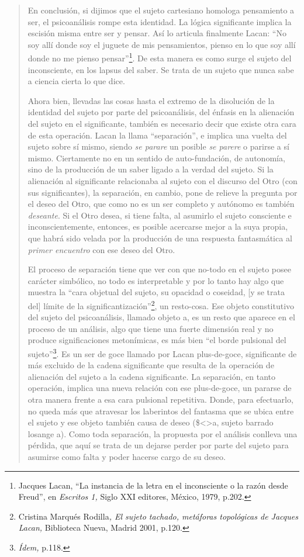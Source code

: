 \begin{quote}
En conclusión, si dijimos que el sujeto cartesiano homologa pensamiento a ser, el psicoanálisis rompe esta identidad. La lógica significante implica la escisión misma entre ser y pensar. Así lo articula finalmente Lacan: \enquote{No soy allí donde soy el juguete de mis pensamientos, pienso en lo que soy allí donde no me pienso pensar}\footnote{Jacques Lacan, \enquote{La instancia de la letra en el inconsciente o la razón desde Freud}, en \emph{Escritos 1,} Siglo XXI editores, México, 1979, p.202.}. De esta manera es como surge el sujeto del inconsciente, en los lapsus del saber. Se trata de un sujeto que nunca sabe a ciencia cierta lo que dice.

Ahora bien, llevadas las cosas hasta el extremo de la disolución de la identidad del sujeto por parte del psicoanálisis, del énfasis en la alienación del sujeto en el significante, también es necesario decir que existe otra cara de esta operación. Lacan la llama \enquote{separación}, e implica una vuelta del sujeto sobre sí mismo, siendo \emph{se parare} un posible \emph{se parere} o parirse a sí mismo. Ciertamente no en un sentido de auto-fundación, de autonomía, sino de la producción de un saber ligado a la verdad del sujeto. Si la alienación al significante relacionaba al sujeto con el discurso del Otro (con sus significantes), la separación, en cambio, pone de relieve la pregunta por el deseo del Otro, que como no es un ser completo y autónomo es también \emph{deseante}. Si el Otro desea, si tiene falta, al asumirlo el sujeto consciente e inconscientemente, entonces, es posible acercarse mejor a la suya propia, que habrá sido velada por la producción de una respuesta fantasmática al \emph{primer encuentro} con ese deseo del Otro.

El proceso de separación tiene que ver con que no-todo en el sujeto posee carácter simbólico, no todo es interpretable y por lo tanto hay algo que muestra la \enquote{cara objetual del sujeto, su opacidad o coseidad, {[}y se trata del{]} límite de la significantización}\footnote{Cristina Marqués Rodilla\emph{, El sujeto tachado, metáforas topológicas de Jacques Lacan,} Biblioteca Nueva, Madrid 2001, p.120.}, un resto-cosa. Ese objeto constitutivo del sujeto del psicoanálisis, llamado objeto a, es un resto que aparece en el proceso de un análisis, algo que tiene una fuerte dimensión real y no produce significaciones metonímicas, es más bien \enquote{el borde pulsional del sujeto}\footnote{\emph{Ídem,} p.118.}. Es un ser de goce llamado por Lacan plus-de-goce, significante de más excluido de la cadena significante que resulta de la operación de alienación del sujeto a la cadena significante. La separación, en tanto operación, implica una nueva relación con ese plus-de-goce, un pararse de otra manera frente a esa cara pulsional repetitiva. Donde, para efectuarlo, no queda más que atravesar los laberintos del fantasma que se ubica entre el sujeto y ese objeto también causa de deseo (\$\textless\textgreater a, sujeto barrado losange a). Como toda separación, la propuesta por el análisis conlleva una pérdida, que aquí se trata de un dejarse perder por parte del sujeto para asumirse como falta y poder hacerse cargo de su deseo.


\end{quote}
